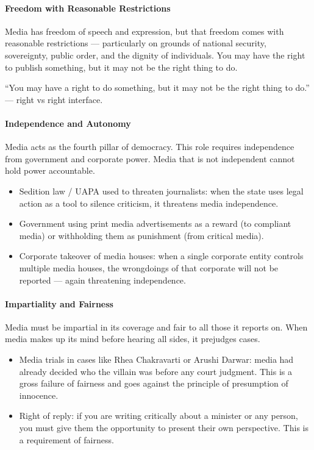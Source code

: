 \paragraph{Freedom with Reasonable Restrictions} Media has freedom of speech and expression, but that freedom comes with reasonable restrictions --- particularly on grounds of national security, sovereignty, public order, and the dignity of individuals. You may have the right to publish something, but it may not be the right thing to do.

\begin{KeyConcept}
``You may have a right to do something, but it may not be the right thing to do.'' --- right vs right interface.
\end{KeyConcept}

\paragraph{Independence and Autonomy} Media acts as the fourth pillar of democracy. This role requires independence from government and corporate power. Media that is not independent cannot hold power accountable.

\begin{ExampleBox}
\begin{itemize}
\item Sedition law / UAPA used to threaten journalists: when the state uses legal action as a tool to silence criticism, it threatens media independence.
\item Government using print media advertisements as a reward (to compliant media) or withholding them as punishment (from critical media).
\item Corporate takeover of media houses: when a single corporate entity controls multiple media houses, the wrongdoings of that corporate will not be reported --- again threatening independence.
\end{itemize}
\end{ExampleBox}

\paragraph{Impartiality and Fairness} Media must be impartial in its coverage and fair to all those it reports on. When media makes up its mind before hearing all sides, it prejudges cases.

\begin{ExampleBox}
\begin{itemize}
\item Media trials in cases like Rhea Chakravarti or Arushi Darwar: media had already decided who the villain was before any court judgment. This is a gross failure of fairness and goes against the principle of presumption of innocence.
\item Right of reply: if you are writing critically about a minister or any person, you must give them the opportunity to present their own perspective. This is a requirement of fairness.
\end{itemize}
\end{ExampleBox}

